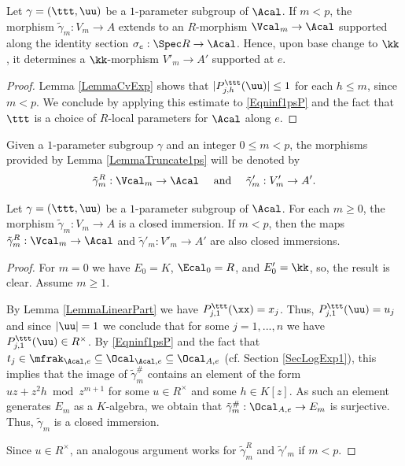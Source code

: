 \begin{lemma}
\notready\label{LemmaTruncate1ps} Let $\gamma=(\ttt,\uu)$ be a $1$-parameter subgroup of $\Acal$. If $m<p$, the morphism $\tilde{\gamma}_m:V_m\to A$ extends to an $R$-morphism $\Vcal_m\to \Acal$ supported along the identity section $\sigma_e:\Spec R\to \Acal$. Hence, upon base change to $\kk$, it determines a $\kk$-morphism $V'_m\to A'$ supported at $e$.
\end{lemma}
\begin{proof} Lemma \ref{LemmaCvExp} shows that $|P^\ttt_{j,h}(\uu)|\le 1$ for each $h\le m$, since $m<p$. We conclude by applying this estimate to \eqref{Eqninf1psP} and the fact that $\ttt$ is a choice of $R$-local parameters for $\Acal$ along $e$.
\end{proof}
Given a $1$-parameter subgroup $\gamma$ and an integer $0\le m<p$, the morphisms provided by Lemma \ref{LemmaTruncate1ps} will be denoted by
$$
\tilde{\gamma}^R_m:\Vcal_m\to \Acal\quad \mbox{ and }\quad \tilde{\gamma}'_m : V'_m\to A'.
$$
\begin{lemma}
\notready\label{LemmaClosedImm} Let $\gamma=(\ttt,\uu)$ be a $1$-parameter subgroup of $\Acal$. For each $m\ge 0$, the morphism $\tilde{\gamma}_m:V_m\to A$ is a closed immersion. If $m<p$, then the maps $\tilde{\gamma}^R_m:\Vcal_m\to \Acal$ and $\tilde{\gamma}'_m:V'_m\to A'$ are also closed immersions.
\end{lemma}
\begin{proof} For $m=0$ we have $E_0=K$, $\Ecal_0=R$, and $E'_0=\kk$, so, the result is clear. Assume $m\ge 1$.

By Lemma \ref{LemmaLinearPart} we have $P^\ttt_{j,1}(\xx)=x_j$. Thus, $P^\ttt_{j,1}(\uu)=u_j$ and since $|\uu|=1$ we conclude that for some $j=1,...,n$ we have $P^\ttt_{j,1}(\uu)\in R^\times$. By \eqref{Eqninf1psP} and the fact that $t_j\in \mfrak_{\Acal,e}\subseteq \Ocal_{\Acal,e}\subseteq \Ocal_{A,e}$ (cf. Section \ref{SecLogExp1}), this implies that the image of $\tilde{\gamma}_m^\#$ contains an element of the form $uz+z^2h\bmod z^{m+1}$ for some $u\in R^\times$ and some $h\in K[z]$. As such an element generates $E_m$ as a $K$-algebra, we obtain that $\tilde{\gamma}_m^\#:\Ocal_{A,e}\to E_m$ is surjective. Thus, $\tilde{\gamma}_m$ is a closed immersion.

Since $u\in R^\times$, an analogous argument works for $\tilde{\gamma}^R_m$ and $\tilde{\gamma}'_m$ if $m<p$.
\end{proof}


